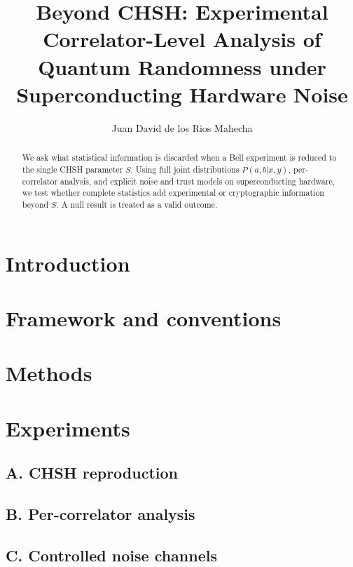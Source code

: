 \documentclass[aps,prx,twocolumn,superscriptaddress,nofootinbib]{revtex4-2}
\begin{document}
\title{Beyond CHSH: Experimental Correlator-Level Analysis of Quantum
Randomness under Superconducting Hardware Noise}

\author{Juan David de los Rios Mahecha}

\begin{abstract}
We ask what statistical information is discarded when a Bell experiment is
reduced to the single CHSH parameter $S$. Using full joint distributions
$P(a,b|x,y)$, per-correlator analysis, and explicit noise and trust models on
superconducting hardware, we test whether complete statistics add experimental
or cryptographic information beyond $S$. A null result is treated as a valid
outcome.
\end{abstract}

\maketitle

\section{Introduction}

\section{Framework and conventions}

\section{Methods}

\section{Experiments}
\subsection{A. CHSH reproduction}
\subsection{B. Per-correlator analysis}
\subsection{C. Controlled noise channels}
\end{document}
